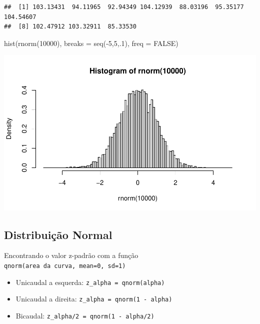 \documentclass[
]{article}
\newenvironment{Shaded}{\begin{snugshade}}{\end{snugshade}}
\newcommand{\AttributeTok}[1]{\textcolor[rgb]{0.77,0.63,0.00}{#1}}
\newcommand{\ConstantTok}[1]{\textcolor[rgb]{0.00,0.00,0.00}{#1}}
\newcommand{\DecValTok}[1]{\textcolor[rgb]{0.00,0.00,0.81}{#1}}
\newcommand{\FunctionTok}[1]{\textcolor[rgb]{0.00,0.00,0.00}{#1}}
\newcommand{\NormalTok}[1]{#1}
\newcommand{\SpecialCharTok}[1]{\textcolor[rgb]{0.00,0.00,0.00}{#1}}
\providecommand{\tightlist}{%
  \setlength{\itemsep}{0pt}\setlength{\parskip}{0pt}}
\begin{document}
\begin{verbatim}
##  [1] 103.13431  94.11965  92.94349 104.12939  88.03196  95.35177 104.54607
##  [8] 102.47912 103.32911  85.33530
\end{verbatim}

\begin{Shaded}
\begin{Highlighting}[]
\FunctionTok{hist}\NormalTok{(}\FunctionTok{rnorm}\NormalTok{(}\DecValTok{10000}\NormalTok{), }\AttributeTok{breaks =} \FunctionTok{seq}\NormalTok{(}\SpecialCharTok{{-}}\DecValTok{5}\NormalTok{,}\DecValTok{5}\NormalTok{,.}\DecValTok{1}\NormalTok{),}
     \AttributeTok{freq =} \ConstantTok{FALSE}\NormalTok{)}
\end{Highlighting}
\end{Shaded}

\includegraphics{DistNormal_files/figure-latex/unnamed-chunk-7-1.pdf}

\hypertarget{distribuiuxe7uxe3o-normal}{%
\subsection{Distribuição Normal}\label{distribuiuxe7uxe3o-normal}}

Encontrando o valor z-padrão com a função
\texttt{qnorm(area\ da\ curva,\ mean=0,\ sd=1)}

\begin{itemize}
\tightlist
\item
  Unicaudal a esquerda: \texttt{z\_alpha\ =\ qnorm(alpha)}
\item
  Unicaudal a direita: \texttt{z\_alpha\ =\ qnorm(1\ -\ alpha)}
\item
  Bicaudal: \texttt{z\_alpha/2\ =\ qnorm(1\ -\ alpha/2)}
\end{itemize}
\end{document}
